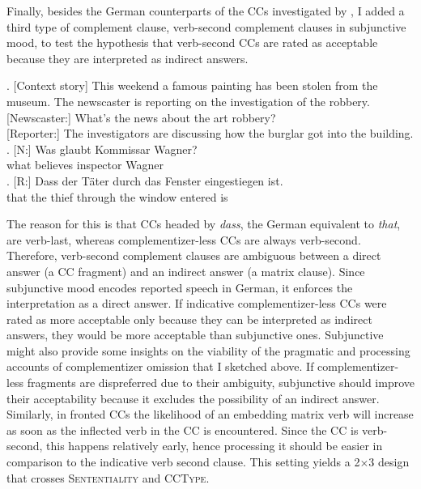 Finally, besides the German counterparts of the CCs investigated by \citet{merchant.etal2013}, I added a third type of complement clause, verb-second complement clauses in subjunctive mood, to test the hypothesis that verb-second CCs are rated as acceptable because they are interpreted as indirect answers.

\newpage
\ex. [Context story] This weekend a famous painting has been stolen from the museum. The newscaster is reporting on the investigation of the robbery.\\ \mbox{}[Newscaster:] What's the news about the art robbery?\\ \mbox{}[Reporter:] The investigators are discussing how the burglar got into the building.\label{ex:ccs-experiment-sample-item}
\ag. [N:] Was glaubt Kommissar Wagner?\\
\mbox{} what believes inspector Wagner\\
\bg. [R:] Dass der Täter durch  das Fenster  eingestiegen ist.\\
     \mbox{} that  the thief through the window  entered is\\

The reason for this is that CCs headed by \textit{dass}, the German equivalent to \textit{that}, are verb-last, whereas complementizer-less CCs are always verb-second. Therefore, verb-second complement clauses are ambiguous between a direct answer (a CC fragment) and an indirect answer (a matrix clause). Since subjunctive mood encodes reported speech in German, it enforces the interpretation as a direct answer. If indicative complementizer-less CCs were rated as more acceptable only because they can be interpreted as indirect answers, they would be more acceptable than subjunctive ones. Subjunctive might also provide some insights on the viability of the pragmatic and processing accounts of complementizer omission that I sketched above. If complementizer-less fragments are dispreferred due to their ambiguity, subjunctive should improve their acceptability because it excludes the possibility of an indirect answer. Similarly, in fronted CCs the likelihood of an embedding matrix verb will increase as soon as the inflected verb in the CC is encountered. Since the CC is verb-second, this happens relatively early, hence processing it should be easier in comparison to the indicative verb second clause. This setting yields a 2$\times$3 design that crosses \textsc{Sententiality} and \textsc{CCType}.\largerpage

